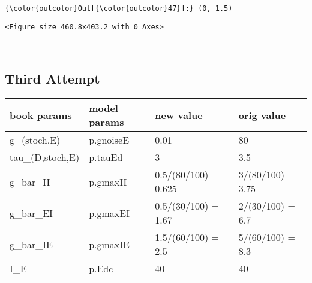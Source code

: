 \documentclass[11pt]{article}
\begin{document}
\begin{Verbatim}[commandchars=\\\{\}]
{\color{outcolor}Out[{\color{outcolor}47}]:} (0, 1.5)
\end{Verbatim}
            
    
    \begin{verbatim}
<Figure size 460.8x403.2 with 0 Axes>
    \end{verbatim}

    
    \begin{center}
    \end{center}
    { \hspace*{\fill} \\}
    
    \subsection{Third Attempt}\label{third-attempt}

\begin{longtable}[]{@{}llll@{}}
\toprule
book params & model params & new value & orig value\tabularnewline
\midrule
\endhead
g\_(stoch,E) & p.gnoiseE & 0.01 & 80\tabularnewline
tau\_(D,stoch,E) & p.tauEd & 3 & 3.5\tabularnewline
g\_bar\_II & p.gmaxII & 0.5/(80/100) = 0.625 & 3/(80/100) =
3.75\tabularnewline
g\_bar\_EI & p.gmaxEI & 0.5/(30/100) = 1.67 & 2/(30/100) =
6.7\tabularnewline
g\_bar\_IE & p.gmaxIE & 1.5/(60/100) = 2.5 & 5/(60/100) =
8.3\tabularnewline
I\_E & p.Edc & 40 & 40\tabularnewline
\bottomrule
\end{longtable}
\end{document}
